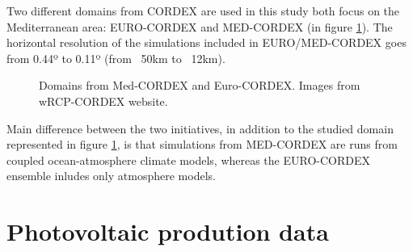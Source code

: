 Two different domains from CORDEX are used in this study both focus on the Mediterranean area: EURO-CORDEX and MED-CORDEX (in figure \ref{fig:cordexdomain}). The horizontal resolution of the simulations included in EURO/MED-CORDEX goes from 0.44º to 0.11º (from ~50km to ~12km).

\begin{figure}[!tbp]
  \centering
  \hfill
  \caption{Domains from Med-CORDEX and Euro-CORDEX. Images from wRCP-CORDEX website.}
    \label{fig:cordexdomain}
\end{figure}

Main difference between the two initiatives, in addition to the studied domain represented in figure \ref{fig:cordexdomain}, is that simulations from MED-CORDEX \cite*{Ruti2016} are runs from coupled ocean-atmosphere climate models, whereas the EURO-CORDEX \cite*{Jacob2010} ensemble inludes only atmosphere models. %


\section{Photovoltaic prodution data}


